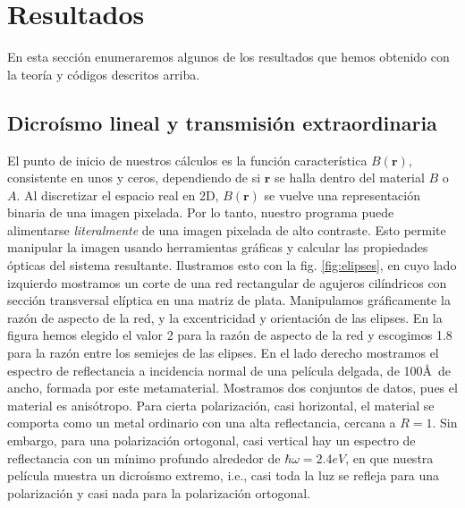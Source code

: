 \documentclass[12pt]{article}
\begin{document}
\section{Resultados}
En esta sección enumeraremos algunos de los resultados que hemos
obtenido con la teoría y códigos descritos arriba.
\subsection{Dicroísmo lineal y transmisión extraordinaria}
El punto de inicio de nuestros cálculos es la función característica
$B(\bm r)$, consistente en unos y ceros, dependiendo de si $\bm r$ se
halla dentro del material $B$ o $A$. Al discretizar el espacio real en
2D,
$B(\bm r)$ se vuelve una representación binaria de una imagen
pixelada. Por lo tanto, nuestro programa puede alimentarse
{\em literalmente} de una imagen pixelada de alto contraste. Esto permite
manipular la imagen usando herramientas gráficas y calcular las
propiedades ópticas del sistema resultante. Ilustramos esto con la
fig. \ref{fig:elipses}, en cuyo lado izquierdo mostramos un corte de
una red rectangular de agujeros cilíndricos con sección transversal
elíptica en una matriz de plata. Manipulamos gráficamente la razón de
aspecto de la red, y la excentricidad y orientación de las elipses. En
la figura hemos elegido el valor 2 para la razón de aspecto de
la red y escogimos 1.8 para la razón entre los semiejes de las
elipses. En el
lado derecho mostramos el espectro de reflectancia a incidencia normal
de una película delgada, de 100\AA\ de ancho, formada por este
metamaterial. Mostramos dos conjuntos de datos, pues el material es
anisótropo. Para cierta polarización, casi horizontal, el material
se comporta como un metal ordinario con una alta reflectancia,
cercana a $R=1$. Sin embargo, para una polarización ortogonal, casi
vertical hay un espectro de reflectancia con un mínimo profundo
alrededor de $\hbar\omega=2.4 eV$, en que nuestra película muestra un
dicroísmo extremo, i.e., casi toda la luz se refleja para una
polarización y casi nada para la polarización ortogonal.\cite{bms12}
\end{document}
